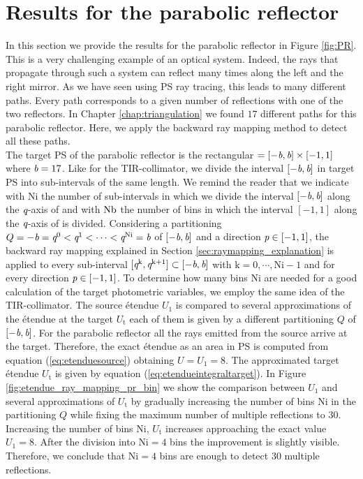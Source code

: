 \section{Results for the parabolic reflector}\label{sec:PR}
In this section we provide the results for the parabolic reflector in Figure \ref{fig:PR}.
This is a very challenging example of an optical system. Indeed, the rays that propagate through such a system can reflect many times along the left and the right mirror. As we have seen using PS ray tracing, this leads to many different paths. Every path corresponds to a given number of reflections with one of the two reflectors. In Chapter \ref{chap:triangulation} we found $17$ different paths for this parabolic reflector. Here, we apply the backward ray mapping method to detect all these paths. \\ \indent
The target PS of the parabolic reflector is the rectangular $=[-\textit{b}, \textit{b}]\times[-1,1]$ where $\textit{b}=17$. Like for the TIR-collimator, we divide the interval $[-\textit{b}, \textit{b}]$ in target PS into sub-intervals of the same length. We remind the reader that we indicate with $\textrm{Ni}$ the number of sub-intervals in which we divide the interval $[-\textit{b}, \textit{b}]$ along the $\textit{q}$-axis of  and with $\textrm{Nb}$ the number of bins in which the interval $[-1,1]$ along the $\textit{q}$-axis of  is divided. Considering a partitioning $Q = -\textit{b}=\textit{q}^{0}<\textit{q}^{1}<\cdots<\textit{q}^{\textrm{Ni}}=\textit{b}$ of $[-\textit{b}, \textit{b}]$ and a direction $\textit{p}\in[-1,1]$, the backward ray mapping explained in Section \ref{sec:raymapping_explanation} is applied to every sub-interval $[\textit{q}^{\textrm{k}}, \textit{q}^{\textrm{k+1}}]\subset[-\textit{b}, \textit{b}]$ with $\textrm{k}=0, \cdots, \textrm{Ni}-1$ and for every direction $\textit{p}\in[-1,1]$. To determine how many bins $\textrm{Ni}$ are needed for a good calculation of the target photometric variables, we employ the same idea of the TIR-collimator. The source \'{e}tendue $U_1$ is compared to several approximations of the \'{e}tendue at the target $U_{\textrm{t}}$ each of them is given by a different partitioning $Q$ of $[-\textit{b}, \textit{b}]$. For the parabolic reflector all the rays emitted from the source arrive at the target. Therefore, the exact \'{e}tendue as an area in PS is computed from equation (\ref{eq:etenduesource}) obtaining $U=U_1=8$. The approximated target \'{e}tendue $U_{\textrm{t}}$ is given by equation (\ref{eq:etendueintegraltarget}). In Figure \ref{fig:etendue_ray_mapping_pr_bin} we show the comparison between $U_1$ and several approximations of $U_{\textrm{t}}$ by gradually increasing the number of bins $\textrm{Ni}$ in the partitioning $Q$ while fixing the maximum number of multiple reflections to $30$. Increasing the number of bins $\textrm{Ni}$, $U_{\textrm{t}}$ increases approaching the exact value $U_1=8$. After the division into $\textrm{Ni}=4$ bins the improvement is slightly visible. Therefore, we conclude that $\textrm{Ni}=4$ bins are enough to detect $30$ multiple reflections.
